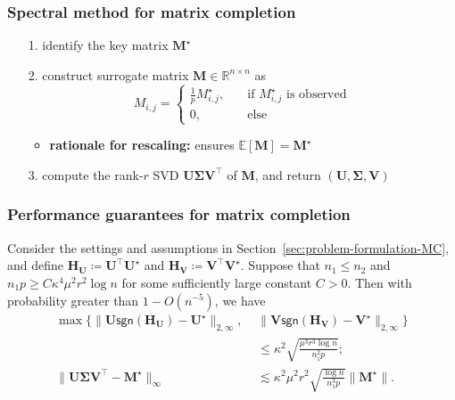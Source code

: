 \documentclass[compress,
mathserif,wide,%
]{beamer}
\begin{document}
\begin{frame}
\frametitle{Spectral method for matrix completion}

\begin{itemize}
	
	\item[{\color{black}1.}] identify the key matrix $\bm{M}^{\star}$
	\item[{\color{black}2.}] construct surrogate matrix ${\bm{M}}\in \mathbb{R}^{n\times n}$ as
	\[
		{M}_{i,j} = \begin{cases} \frac{1}{p} M_{i,j}^{\star}, \quad & \text{if }M_{i,j}^{\star}\text{ is observed} \\ 
					0,  & \text{else}	\end{cases} 
	\]
	\begin{itemize}
		\item {\bf rationale for rescaling:} ensures $\mathbb{E}[{\bm{M}}] = \bm{M}^{\star}$
	\end{itemize}

	\bigskip

\item[{\color{black}3.}] compute the rank-$r$ SVD ${\bm{U}}{\bm{\Sigma}}{\bm{V}}^{\top}$ of ${\bm{M}}$, and return $({\bm{U}}, {\bm{\Sigma}}, {\bm{V}})$

	
\end{itemize}


\end{frame}



\begin{frame}
	\frametitle{Performance guarantees for matrix completion}
\begin{theorem}
\label{thm:mc-inf}
%
Consider the settings and assumptions in Section~\ref{sec:problem-formulation-MC}, and
define $\bm{H}_{\bm{U}}\coloneqq\bm{U}^{\top}\bm{U}^{\star}$ and
$\bm{H}_{\bm{V}}\coloneqq\bm{V}^{\top}\bm{V}^{\star}$.
Suppose that $n_1\leq n_2$ and $n_{1}p\geq C\kappa^{4}\mu^{2}r^{2}\log n$ for some
sufficiently large constant $C>0$. Then with probability greater
than $1-O(n^{-5})$, we have
%
\begin{subequations}
%
\begin{align}
\max\{\|\bm{U}\mathsf{sgn}(\bm{H}_{\bm{U}})-\bm{U}^{\star}\|_{2,\infty},\,\,&\|\bm{V}\mathsf{sgn}(\bm{H}_{\bm{V}})-\bm{V}^{\star}\|_{2,\infty}\} \nonumber\\& \leq\kappa^{2}\sqrt{\frac{\mu^{3}r^{3}\log n}{n_{1}^{2}p}};
\label{eq:mc-inf-claim-1}\\
\|\bm{U}\bm{\Sigma}\bm{V}^{\top}-\bm{M}^{\star}\|_{\infty} & \lesssim\kappa^{2}\mu^{2}r^{2}\sqrt{\frac{\log n}{n_{1}^{3}p}}\|\bm{M}^{\star}\|.
\label{eq:mc-inf-claim-2}
\end{align}
%
\end{subequations}
%
\end{theorem}
\end{frame}
\end{document}
